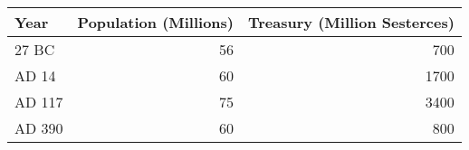 \begin{tabular}{lrr}
\toprule
Year & Population (Millions) & Treasury (Million Sesterces) \\
\midrule
27 BC & 56 & 700 \\
AD 14 & 60 & 1700 \\
AD 117 & 75 & 3400 \\
AD 390 & 60 & 800 \\
\bottomrule
\end{tabular}
